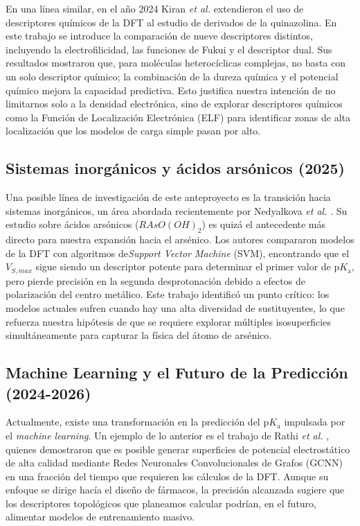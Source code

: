 \documentclass[12pt]{article}
\begin{document}
	En una l\'{i}nea similar, en el año 2024 Kiran \textit{et al.} \cite{Kiran2024} extendieron el uso de descriptores qu\'{i}micos de la DFT al estudio de derivados de la quinazolina. En este trabajo se introduce la comparaci\'{o}n de nueve descriptores distintos, incluyendo la electrofilicidad, las funciones de Fukui y el descriptor dual. Sus resultados mostraron que, para mol\'{e}culas heteroc\'{i}clicas complejas, no basta con un solo descriptor qu\'{i}mico; la combinaci\'{o}n de la dureza qu\'{i}mica y el potencial qu\'{i}mico mejora la capacidad predictiva. Esto justifica nuestra intenci\'{o}n de no limitarnos solo a la densidad electr\'{o}nica, sino de explorar descriptores qu\'{i}micos como la Funci\'{o}n de Localizaci\'{o}n Electr\'{o}nica (ELF) para identificar zonas de alta localizaci\'{o}n que los modelos de carga simple pasan por alto.
	
	\clearpage
	
	
	\subsection{Sistemas inorg\'{a}nicos y \'{a}cidos ars\'{o}nicos (2025)}
	
	Una posible l\'{i}nea de investigaci\'{o}n de este anteproyecto es la transici\'{o}n hacia sistemas inorg\'{a}nicos, un \'{a}rea abordada recientemente por Nedyalkova \textit{et al.} \cite{Nedyalkova2025}. Su estudio sobre \'{a}cidos ars\'{o}nicos ($RAsO(OH)_2$) es quiz\'{a} el antecedente m\'{a}s directo para nuestra expansi\'{o}n hacia el ars\'{e}nico. Los autores compararon modelos de la DFT con algoritmos de\textit{Support Vector Machine} (SVM), encontrando que el $V_{S,max}$ sigue siendo un descriptor potente para determinar el primer valor de $\mathrm{p}K_{\mathrm{a}}$, pero pierde precisi\'{o}n en la segunda desprotonaci\'{o}n debido a efectos de polarizaci\'{o}n del centro met\'{a}lico. Este trabajo identific\'{o} un punto cr\'{i}tico: los modelos actuales sufren cuando hay una alta diversidad de sustituyentes, lo que refuerza nuestra hip\'{o}tesis de que se requiere explorar m\'{u}ltiples isosuperficies simult\'{a}neamente para capturar la f\'{i}sica del \'{a}tomo de ars\'{e}nico.
	
	\subsection{Machine Learning y el Futuro de la Predicci\'{o}n (2024-2026)}
	
	Actualmente, existe una transformaci\'{o}n en la predicci\'{o}n del $\mathrm{p}K_{\mathrm{a}}$ impulsada por el \textit{machine learning}. Un ejemplo de lo anterior es el trabajo de Rathi \textit{et al.} \cite{Rathi2020}, quienes demostraron que es posible generar superficies de potencial electrost\'{a}tico de alta calidad mediante Redes Neuronales Convolucionales de Grafos (GCNN) en una fracci\'{o}n del tiempo que requieren los c\'{a}lculos de la DFT. Aunque  su enfoque se dirige hacía el diseño de f\'{a}rmacos, la precisi\'{o}n alcanzada sugiere que los descriptores topol\'{o}gicos que planeamos calcular podr\'{i}an, en el futuro, alimentar modelos de entrenamiento masivo. 
	
\end{document}
